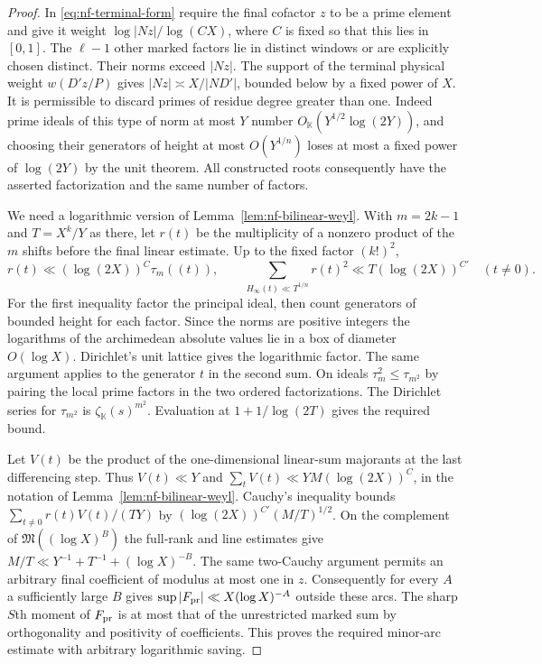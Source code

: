 \documentclass[11pt,letterpaper]{article}
\theoremstyle{definition}
\numberwithin{equation}{section}
\begin{document}
\begin{proof}
In \eqref{eq:nf-terminal-form} require the final cofactor $z$ to
be a prime element and give it weight $\log|Nz|/\log(CX)$, where
$C$ is fixed so that this lies in $[0,1]$. The $\ell-1$ other marked
factors lie in distinct windows or are explicitly chosen distinct.
Their norms exceed $|Nz|$. The support of the terminal physical weight
$w(D'z/P)$ gives $|Nz|\asymp X/|ND'|$, bounded below by a fixed
power of $X$. It is permissible to discard primes of residue degree
greater than one. Indeed prime ideals of this type of norm at most
$Y$ number $O_{\mathbb K}(Y^{1/2}\log(2Y))$, and choosing their
generators of height at most $O(Y^{1/n})$ loses at most a fixed power
of $\log(2Y)$ by the unit theorem. All constructed roots consequently
have the asserted factorization and the same number of factors.

We need a logarithmic version of Lemma~\ref{lem:nf-bilinear-weyl}.
With $m=2k-1$ and $T=X^k/Y$ as there, let $r(t)$ be the multiplicity
of a nonzero product of the $m$ shifts before the final linear estimate.
Up to the fixed factor $(k!)^2$,
\[
 r(t)\ll (\log(2X))^C\tau_m((t)),\qquad
 \sum_{H_\infty(t)\ll T^{1/n}}r(t)^2\ll T(\log(2X))^{C'}
 \quad(t\ne0).
\]
For the first inequality factor the principal ideal, then count
generators of bounded height for each factor. Since the norms are
positive integers the logarithms of the archimedean absolute values
lie in a box of diameter $O(\log X)$. Dirichlet's unit lattice gives
the logarithmic factor. The same argument applies to the generator
$t$ in the second sum. On ideals $\tau_m^2\le\tau_{m^2}$ by pairing
the local prime factors in the two ordered factorizations. The
Dirichlet series for $\tau_{m^2}$ is $\zeta_{\mathbb K}(s)^{m^2}$.
Evaluation at $1+1/\log(2T)$ gives the required bound.

Let $V(t)$ be the product of the one-dimensional linear-sum
majorants at the last differencing step. Thus $V(t)\ll Y$ and
$\sum_t V(t)\ll YM(\log(2X))^C$, in the notation of
Lemma~\ref{lem:nf-bilinear-weyl}. Cauchy's inequality bounds
$\sum_{t\ne0}r(t)V(t)/(TY)$ by
$(\log(2X))^{C'}(M/T)^{1/2}$. On the complement of
$\mathfrak M((\log X)^B)$ the full-rank and line estimates give
$M/T\ll Y^{-1}+T^{-1}+(\log X)^{-B}$. The same two-Cauchy
argument permits an arbitrary final coefficient of modulus at most one
in $z$. Consequently for every $A$ a sufficiently large $B$ gives
$\sup |F_{\rm pr}|\ll X(\log X)^{-A}$ outside these arcs.
The sharp $S$th moment of $F_{\rm pr}$ is at most that of the
unrestricted marked sum by orthogonality and positivity of
coefficients. This proves the required minor-arc estimate with
arbitrary logarithmic saving.


\end{proof}
\end{document}
